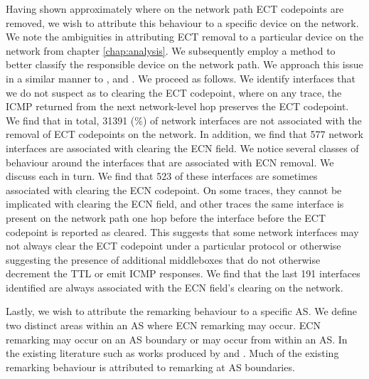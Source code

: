 \documentclass{l4proj}
\begin{document}
Having shown approximately where on the network path ECT codepoints are removed, we wish to attribute this behaviour to a specific device on the network. We note the ambiguities in attributing ECT removal to a particular device on the network from chapter \ref{chap:analysis}. We subsequently employ a method to better classify the responsible device on the network path. We approach this issue in a similar manner to \cite{mcquistin_is_2015}, and \cite{bauer_measuring_2011}. We proceed as follows. We identify interfaces that we do not suspect as to clearing the ECT codepoint, where on any trace, the ICMP returned from the next network-level hop preserves the ECT codepoint. We find that in total, 31391 (\%) of network interfaces are not associated with the removal of ECT codepoints on the network. In addition, we find that 577 network interfaces are associated with clearing the ECN field. We notice several classes of behaviour around the interfaces that are associated with ECN removal. We discuss each in turn. We find that 523 of these interfaces are sometimes associated with clearing the ECN codepoint. On some traces, they cannot be implicated with clearing the ECN field, and other traces the same interface is present on the network path one hop before the interface before the ECT codepoint is reported as cleared. This suggests that some network interfaces may not always clear the ECT codepoint under a particular protocol or otherwise suggesting the presence of additional middleboxes that do not otherwise decrement the TTL or emit ICMP responses. We find that the last 191 interfaces identified are always associated with the ECN field's clearing on the network.

Lastly, we wish to attribute the remarking behaviour to a specific AS. We define two distinct areas within an AS where ECN remarking may occur. ECN remarking may occur on an AS boundary or may occur from within an AS. In the existing literature such as works produced by \cite{mcquistin_is_2015} and \cite{bauer_measuring_2011}. Much of the existing remarking behaviour is attributed to remarking at AS boundaries.
\end{document}
